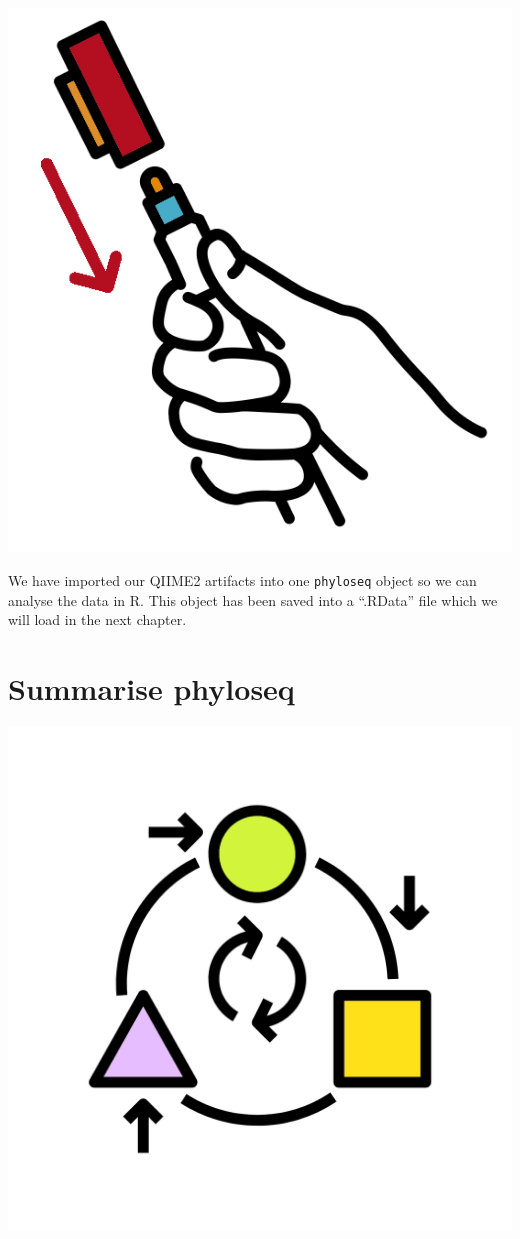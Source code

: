 \documentclass[
]{book}
\begin{document}
\includegraphics{figures/recap.png}

We have imported our QIIME2 artifacts into one \texttt{phyloseq} object so we can analyse the data in R. This object has been saved into a ``.RData'' file which we will load in the next chapter.

\hypertarget{sum_phyloseq_chap}{%
\chapter{Summarise phyloseq}\label{sum_phyloseq_chap}}

\includegraphics{figures/transform.png}
\end{document}
